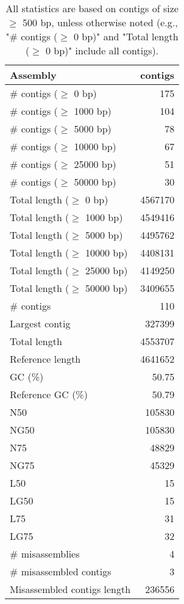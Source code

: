 \documentclass[12pt,a4paper]{article}
\begin{document}
\begin{table}[ht]
\begin{center}
\caption{All statistics are based on contigs of size $\geq$ 500 bp, unless otherwise noted (e.g., "\# contigs ($\geq$ 0 bp)" and "Total length ($\geq$ 0 bp)" include all contigs).}
\begin{tabular}{|l*{1}{|r}|}
\hline
Assembly & contigs \\ \hline
\# contigs ($\geq$ 0 bp) & 175 \\ \hline
\# contigs ($\geq$ 1000 bp) & 104 \\ \hline
\# contigs ($\geq$ 5000 bp) & 78 \\ \hline
\# contigs ($\geq$ 10000 bp) & 67 \\ \hline
\# contigs ($\geq$ 25000 bp) & 51 \\ \hline
\# contigs ($\geq$ 50000 bp) & 30 \\ \hline
Total length ($\geq$ 0 bp) & 4567170 \\ \hline
Total length ($\geq$ 1000 bp) & 4549416 \\ \hline
Total length ($\geq$ 5000 bp) & 4495762 \\ \hline
Total length ($\geq$ 10000 bp) & 4408131 \\ \hline
Total length ($\geq$ 25000 bp) & 4149250 \\ \hline
Total length ($\geq$ 50000 bp) & 3409655 \\ \hline
\# contigs & 110 \\ \hline
Largest contig & 327399 \\ \hline
Total length & 4553707 \\ \hline
Reference length & 4641652 \\ \hline
GC (\%) & 50.75 \\ \hline
Reference GC (\%) & 50.79 \\ \hline
N50 & 105830 \\ \hline
NG50 & 105830 \\ \hline
N75 & 48829 \\ \hline
NG75 & 45329 \\ \hline
L50 & 15 \\ \hline
LG50 & 15 \\ \hline
L75 & 31 \\ \hline
LG75 & 32 \\ \hline
\# misassemblies & 4 \\ \hline
\# misassembled contigs & 3 \\ \hline
Misassembled contigs length & 236556 \\ \hline

\end{tabular}
\end{center}
\end{table}
\end{document}
